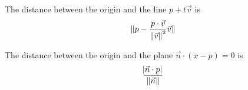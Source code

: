 \begin{theorem}
    The distance between the origin and the line $p + t \vec{v}$ is 
    \begin{equation}
        \Vert {p - \frac{p \cdot \vec{v}}{ \left\Vert {\vec{v}} \right\Vert ^2} \vec{v}} \Vert
    \end{equation}
\end{theorem}

\begin{theorem}
    The distance between the origin and the plane $\vec{n} \cdot (x - p) = 0$ is    
    \begin{equation}
        \frac{\abs{\vec{n} \cdot p}}{\left\Vert {\vec{n}} \right\Vert}
    \end{equation}
\end{theorem}
































































































































